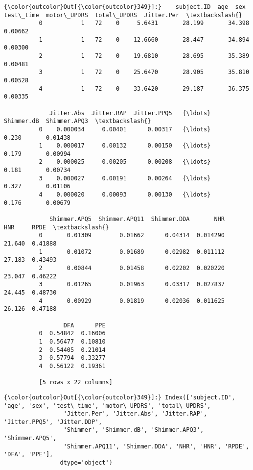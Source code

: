 \documentclass[11pt]{article}
\begin{document}
\begin{Verbatim}[commandchars=\\\{\}]
{\color{outcolor}Out[{\color{outcolor}349}]:}    subject.ID  age  sex  test\_time  motor\_UPDRS  total\_UPDRS  Jitter.Per  \textbackslash{}
          0           1   72    0     5.6431       28.199       34.398     0.00662   
          1           1   72    0    12.6660       28.447       34.894     0.00300   
          2           1   72    0    19.6810       28.695       35.389     0.00481   
          3           1   72    0    25.6470       28.905       35.810     0.00528   
          4           1   72    0    33.6420       29.187       36.375     0.00335   
          
             Jitter.Abs  Jitter.RAP  Jitter.PPQ5   {\ldots}     Shimmer.dB  Shimmer.APQ3  \textbackslash{}
          0    0.000034     0.00401      0.00317   {\ldots}          0.230       0.01438   
          1    0.000017     0.00132      0.00150   {\ldots}          0.179       0.00994   
          2    0.000025     0.00205      0.00208   {\ldots}          0.181       0.00734   
          3    0.000027     0.00191      0.00264   {\ldots}          0.327       0.01106   
          4    0.000020     0.00093      0.00130   {\ldots}          0.176       0.00679   
          
             Shimmer.APQ5  Shimmer.APQ11  Shimmer.DDA       NHR     HNR     RPDE  \textbackslash{}
          0       0.01309        0.01662      0.04314  0.014290  21.640  0.41888   
          1       0.01072        0.01689      0.02982  0.011112  27.183  0.43493   
          2       0.00844        0.01458      0.02202  0.020220  23.047  0.46222   
          3       0.01265        0.01963      0.03317  0.027837  24.445  0.48730   
          4       0.00929        0.01819      0.02036  0.011625  26.126  0.47188   
          
                 DFA      PPE  
          0  0.54842  0.16006  
          1  0.56477  0.10810  
          2  0.54405  0.21014  
          3  0.57794  0.33277  
          4  0.56122  0.19361  
          
          [5 rows x 22 columns]
\end{Verbatim}
            
\begin{Verbatim}[commandchars=\\\{\}]
{\color{outcolor}Out[{\color{outcolor}349}]:} Index(['subject.ID', 'age', 'sex', 'test\_time', 'motor\_UPDRS', 'total\_UPDRS',
                 'Jitter.Per', 'Jitter.Abs', 'Jitter.RAP', 'Jitter.PPQ5', 'Jitter.DDP',
                 'Shimmer', 'Shimmer.dB', 'Shimmer.APQ3', 'Shimmer.APQ5',
                 'Shimmer.APQ11', 'Shimmer.DDA', 'NHR', 'HNR', 'RPDE', 'DFA', 'PPE'],
                dtype='object')
\end{Verbatim}
            
\end{document}
